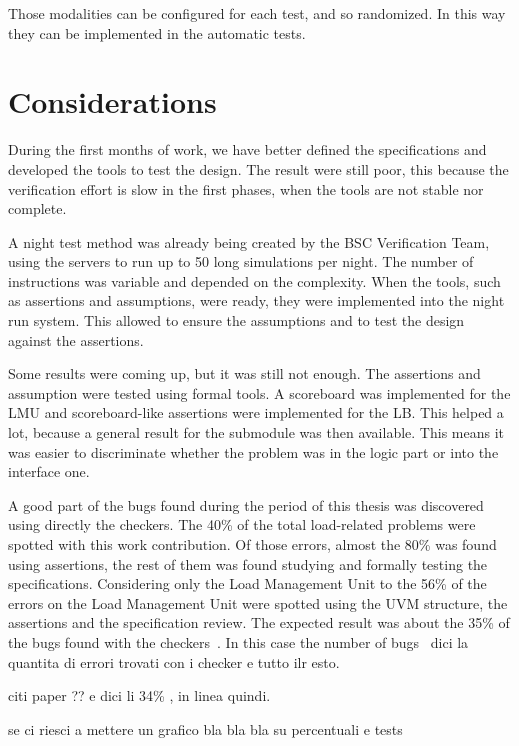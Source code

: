 Those modalities can be configured for each test, and so randomized. In this way they can be implemented in the automatic tests.


\section{Considerations}
During the first months of work, we have better defined the specifications and developed the tools to test the design.
The result were still poor, this because the verification effort is slow in the first phases, when the tools are not stable nor complete.

A night test method was already being created by the BSC Verification Team, using the servers to run up to 50 long simulations per night. The number of instructions was variable and depended on the complexity.
When the tools, such as assertions and assumptions, were ready, they were implemented into the night run system.
This allowed to ensure the assumptions and to test the design against the assertions.

Some results were coming up, but it was still not enough. 
The assertions and assumption were tested using formal tools. A scoreboard was implemented for the LMU and scoreboard-like assertions were implemented for the LB. This helped a lot, because a general result for the submodule was then available. This means it was easier to discriminate whether the problem was in the logic part or into the interface one.

A good part of the bugs found during the period of this thesis was discovered using directly the checkers. The 40\% of the total load-related problems were spotted with this work contribution. Of those errors, almost the 80\% was found using assertions, the rest of them was found studying and formally testing the specifications. 
Considering only the Load Management Unit to the 56\% of the errors on the Load Management Unit were spotted using the UVM structure, the assertions and the specification review. The expected result was about the 35\% of the bugs found with the checkers~\cite{results}. In this case the number of bugs 
\
dici la quantita di errori trovati con i checker e tutto ilr esto.

citi paper ?? e dici li 34\% , in linea quindi. 

se ci riesci a mettere un grafico
bla bla bla su percentuali e tests